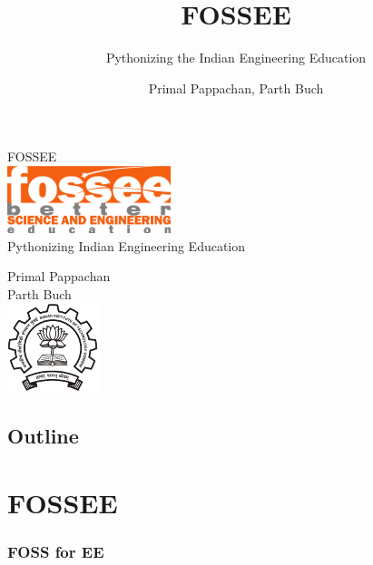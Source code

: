 \documentclass[compress,red]{beamer} %
\title{FOSSEE}
\subtitle{Pythonizing the Indian Engineering Education}
\author[]{Primal Pappachan, Parth Buch}  %
\institute{IIT Bombay}
\date[]{} %
\begin{document}
\begin{frame}
\begin{center}
\vspace{12pt}
{\huge FOSSEE} \\
\vspace{3pt}
\includegraphics[scale=0.95]{logo.png}\\
\vspace{3pt}
{\large Pythonizing Indian Engineering Education} \\
\end{center}
\vspace{7pt}
\begin{center}
\scriptsize Primal Pappachan \\
\scriptsize Parth Buch \\ 
\includegraphics[scale=0.30]{iitb-logo.png}\\
\end{center}
\end{frame}

\begin{frame}
\section*{Outline}
\tableofcontents
\end{frame}

\section{FOSSEE}
\begin{frame}
\frametitle{FOSS for EE}
\end{frame}
\end{document}
